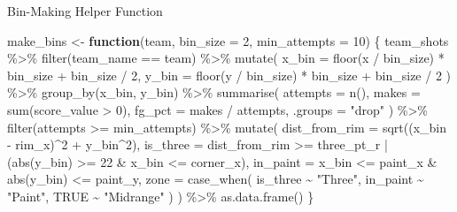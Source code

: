 \documentclass[
  9pt,
  ignorenonframetext,
  aspectratio=169]{beamer}
\newenvironment{Shaded}{\begin{snugshade}}{\end{snugshade}}
\newcommand{\AttributeTok}[1]{\textcolor[rgb]{0.00,0.34,0.68}{#1}}
\newcommand{\ConstantTok}[1]{\textcolor[rgb]{0.67,0.33,0.00}{#1}}
\newcommand{\ControlFlowTok}[1]{\textcolor[rgb]{0.12,0.11,0.11}{\textbf{#1}}}
\newcommand{\DecValTok}[1]{\textcolor[rgb]{0.69,0.50,0.00}{#1}}
\newcommand{\FunctionTok}[1]{\textcolor[rgb]{0.39,0.29,0.61}{#1}}
\newcommand{\NormalTok}[1]{\textcolor[rgb]{0.12,0.11,0.11}{#1}}
\newcommand{\OtherTok}[1]{\textcolor[rgb]{0.00,0.43,0.16}{#1}}
\newcommand{\SpecialCharTok}[1]{\textcolor[rgb]{0.24,0.68,0.91}{#1}}
\newcommand{\StringTok}[1]{\textcolor[rgb]{0.75,0.01,0.01}{#1}}
\begin{document}
\begin{frame}[fragile]{Bin-Making Helper Function}
\label{bin-making-helper-function}
\begin{Shaded}
\begin{Highlighting}[]
\NormalTok{make\_bins }\OtherTok{\textless{}{-}} \ControlFlowTok{function}\NormalTok{(team, }\AttributeTok{bin\_size =} \DecValTok{2}\NormalTok{, }\AttributeTok{min\_attempts =} \DecValTok{10}\NormalTok{) \{}
\NormalTok{  team\_shots }\SpecialCharTok{\%\textgreater{}\%}
    \FunctionTok{filter}\NormalTok{(team\_name }\SpecialCharTok{==}\NormalTok{ team) }\SpecialCharTok{\%\textgreater{}\%}
    \FunctionTok{mutate}\NormalTok{(}
      \AttributeTok{x\_bin =} \FunctionTok{floor}\NormalTok{(x }\SpecialCharTok{/}\NormalTok{ bin\_size) }\SpecialCharTok{*}\NormalTok{ bin\_size }\SpecialCharTok{+}\NormalTok{ bin\_size }\SpecialCharTok{/} \DecValTok{2}\NormalTok{,}
      \AttributeTok{y\_bin =} \FunctionTok{floor}\NormalTok{(y }\SpecialCharTok{/}\NormalTok{ bin\_size) }\SpecialCharTok{*}\NormalTok{ bin\_size }\SpecialCharTok{+}\NormalTok{ bin\_size }\SpecialCharTok{/} \DecValTok{2}
\NormalTok{    ) }\SpecialCharTok{\%\textgreater{}\%}
    \FunctionTok{group\_by}\NormalTok{(x\_bin, y\_bin) }\SpecialCharTok{\%\textgreater{}\%}
    \FunctionTok{summarise}\NormalTok{(}
      \AttributeTok{attempts =} \FunctionTok{n}\NormalTok{(),}
      \AttributeTok{makes =} \FunctionTok{sum}\NormalTok{(score\_value }\SpecialCharTok{\textgreater{}} \DecValTok{0}\NormalTok{),}
      \AttributeTok{fg\_pct =}\NormalTok{ makes }\SpecialCharTok{/}\NormalTok{ attempts,}
      \AttributeTok{.groups =} \StringTok{"drop"}
\NormalTok{    ) }\SpecialCharTok{\%\textgreater{}\%}
    \FunctionTok{filter}\NormalTok{(attempts }\SpecialCharTok{\textgreater{}=}\NormalTok{ min\_attempts) }\SpecialCharTok{\%\textgreater{}\%}
    \FunctionTok{mutate}\NormalTok{(}
      \AttributeTok{dist\_from\_rim =} \FunctionTok{sqrt}\NormalTok{((x\_bin }\SpecialCharTok{{-}}\NormalTok{ rim\_x)}\SpecialCharTok{\^{}}\DecValTok{2} \SpecialCharTok{+}\NormalTok{ y\_bin}\SpecialCharTok{\^{}}\DecValTok{2}\NormalTok{),}
      \AttributeTok{is\_three =}\NormalTok{ dist\_from\_rim }\SpecialCharTok{\textgreater{}=}\NormalTok{ three\_pt\_r }\SpecialCharTok{|}\NormalTok{ (}\FunctionTok{abs}\NormalTok{(y\_bin) }\SpecialCharTok{\textgreater{}=} \DecValTok{22} \SpecialCharTok{\&}\NormalTok{ x\_bin }\SpecialCharTok{\textless{}=}\NormalTok{ corner\_x),}
      \AttributeTok{in\_paint =}\NormalTok{ x\_bin }\SpecialCharTok{\textless{}=}\NormalTok{ paint\_x }\SpecialCharTok{\&} \FunctionTok{abs}\NormalTok{(y\_bin) }\SpecialCharTok{\textless{}=}\NormalTok{ paint\_y,}
      \AttributeTok{zone =} \FunctionTok{case\_when}\NormalTok{(}
\NormalTok{        is\_three }\SpecialCharTok{\textasciitilde{}} \StringTok{"Three"}\NormalTok{,}
\NormalTok{        in\_paint }\SpecialCharTok{\textasciitilde{}} \StringTok{"Paint"}\NormalTok{,}
        \ConstantTok{TRUE} \SpecialCharTok{\textasciitilde{}} \StringTok{"Midrange"}
\NormalTok{      )}
\NormalTok{    ) }\SpecialCharTok{\%\textgreater{}\%}
    \FunctionTok{as.data.frame}\NormalTok{()}
\NormalTok{\}}
\end{Highlighting}
\end{Shaded}
\end{frame}
\end{document}
